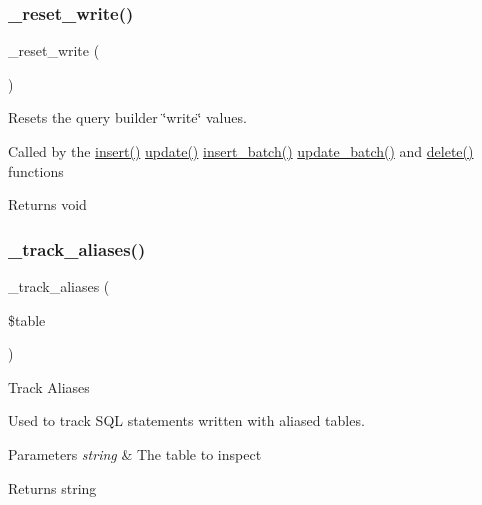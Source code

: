\subsubsection{\texorpdfstring{\+\_\+reset\+\_\+write()}{\_reset\_write()}}
{\footnotesize\ttfamily \+\_\+reset\+\_\+write (\begin{DoxyParamCaption}{ }\end{DoxyParamCaption})\hspace{0.3cm}{\ttfamily [protected]}}

Resets the query builder \char`\"{}write\char`\"{} values.

Called by the \mbox{\hyperlink{class_c_i___d_b__query__builder_a487027d8e320a1ea657af2d7e61df389}{insert()}} \mbox{\hyperlink{class_c_i___d_b__query__builder_a130a26da2dd4e4582ee18f42d71fe6e4}{update()}} \mbox{\hyperlink{class_c_i___d_b__query__builder_ac35c8959b57eb08416e09c094371aaca}{insert\+\_\+batch()}} \mbox{\hyperlink{class_c_i___d_b__query__builder_a718928dc54d935761439538836f1e70d}{update\+\_\+batch()}} and \mbox{\hyperlink{class_c_i___d_b__query__builder_a482722b9989c53ed8ecd68b22df64507}{delete()}} functions

\begin{DoxyReturn}{Returns}
void 
\end{DoxyReturn}
\mbox{\label{class_c_i___d_b__query__builder_afb539c1557a7cb20a190f5b68d96b74a}} 
\subsubsection{\texorpdfstring{\+\_\+track\+\_\+aliases()}{\_track\_aliases()}}
{\footnotesize\ttfamily \+\_\+track\+\_\+aliases (\begin{DoxyParamCaption}\item[{}]{\$table }\end{DoxyParamCaption})\hspace{0.3cm}{\ttfamily [protected]}}

Track Aliases

Used to track S\+QL statements written with aliased tables.


\begin{DoxyParams}{Parameters}
{\em string} & The table to inspect \\
\hline
\end{DoxyParams}
\begin{DoxyReturn}{Returns}
string 
\end{DoxyReturn}
\mbox{\label{class_c_i___d_b__query__builder_aa029600528fc1ce660a23ff4b4667f95}} 
